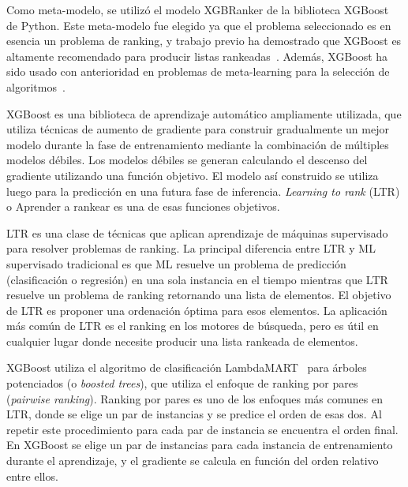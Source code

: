 Como meta-modelo, se utilizó el modelo XGBRanker de la biblioteca XGBoost~\cite{xgboost} de Python. Este meta-modelo fue elegido ya que el problema seleccionado es en esencia un problema de ranking, y trabajo previo ha demostrado que XGBoost es altamente recomendado para producir listas rankeadas~\cite{rankml}. Además, XGBoost ha sido usado con anterioridad en problemas de meta-learning para la selección de algoritmos~\cite{rankml, atomic}.

XGBoost es una biblioteca de aprendizaje automático ampliamente utilizada, que utiliza técnicas de aumento de gradiente para construir gradualmente un mejor modelo durante la fase de entrenamiento mediante la combinación de múltiples modelos débiles. Los modelos débiles se generan calculando el descenso del gradiente utilizando una función objetivo. El modelo así construido se utiliza luego para la predicción en una futura fase de inferencia. \textit{Learning to rank} (LTR) o Aprender a rankear es una de esas funciones objetivos.

LTR es una clase de técnicas que aplican aprendizaje de máquinas supervisado para resolver problemas de ranking. La principal diferencia entre LTR y ML supervisado tradicional es que ML resuelve un problema de predicción (clasificación o regresión) en una sola instancia en el tiempo mientras que LTR resuelve un problema de ranking retornando una lista de elementos. El objetivo de LTR es proponer una ordenación óptima para esos elementos. La aplicación más común de LTR es el ranking en los motores de búsqueda, pero es útil en cualquier lugar donde necesite producir una lista rankeada de elementos.

XGBoost utiliza el algoritmo de clasificación LambdaMART~\cite{burges2010from} para árboles potenciados (o \textit{boosted trees}), que utiliza el enfoque de ranking por pares (\textit{pairwise ranking}). Ranking por pares es uno de los enfoques más comunes en LTR, donde se elige un par de instancias y se predice el orden de esas dos. Al repetir este procedimiento para cada par de instancia se encuentra el orden final. En XGBoost se elige un par de instancias para cada instancia de entrenamiento durante el aprendizaje, y el gradiente se calcula en función del orden relativo entre ellos.


